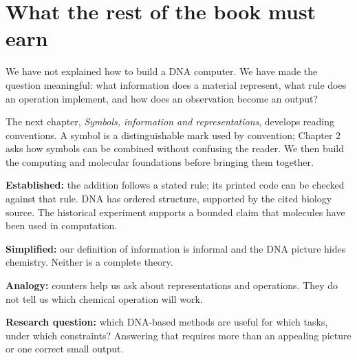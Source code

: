 
\clearpage
\section{What the rest of the book must earn}\label{sec:roadmap}
We have not explained how to build a DNA computer. We have made the question meaningful: what information does a material represent, what rule does an operation implement, and how does an observation become an output?

The next chapter, \emph{Symbols, information and representations}, develops reading conventions. A symbol is a distinguishable mark used by convention; Chapter 2 asks how symbols can be combined without confusing the reader. We then build the computing and molecular foundations before bringing them together.

\textbf{Established:} the addition follows a stated rule; its printed code can be checked against that rule. DNA has ordered structure, supported by the cited biology source. The historical experiment supports a bounded claim that molecules have been used in computation.

\textbf{Simplified:} our definition of information is informal and the DNA picture hides chemistry. Neither is a complete theory.

\textbf{Analogy:} counters help us ask about representations and operations. They do not tell us which chemical operation will work.

\textbf{Research question:} which DNA-based methods are useful for which tasks, under which constraints? Answering that requires more than an appealing picture or one correct small output.


